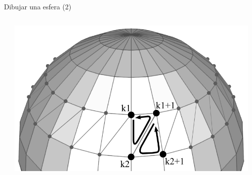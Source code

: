 \documentclass[aspectratio=169,compress]{beamer}
\begin{document}
\begin{frame}{Dibujar una esfera (2)}
\begin{columns}
\begin{column}{0.3\textwidth}
\end{column}
\begin{column}{0.3\textwidth}
\begin{center}
 \includegraphics[width=0.98\textwidth]{FigsOpenGL/gl_sphere03}
 \end{center}
\end{column}
\end{columns}


\end{frame}
\end{document}
